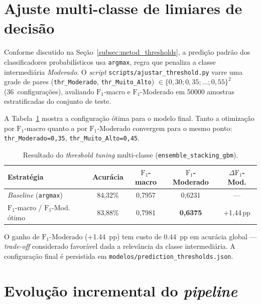 \section{Ajuste multi-classe de limiares de decisão}
\label{sec:res_threshold}

Conforme discutido na Seção~\ref{subsec:metod_thresholds}, a predição padrão dos classificadores probabilísticos usa \texttt{argmax}, regra que penaliza a classe intermediária \emph{Moderado}. O \emph{script} \texttt{scripts/ajustar\_threshold.py} varre uma grade de pares (\texttt{thr\_Moderado}, \texttt{thr\_Muito\_Alto}) \(\in \{0{,}30; 0{,}35; \ldots; 0{,}55\}^2\) (36~configurações), avaliando \(\text{F}_1\)-macro e \(\text{F}_1\)-Moderado em \num{50000} amostras estratificadas do conjunto de teste.

A Tabela~\ref{tab:res_threshold} mostra a configuração ótima para o modelo final. Tanto a otimização por \(\text{F}_1\)-macro quanto a por \(\text{F}_1\)-Moderado convergem para o mesmo ponto: \texttt{thr\_Moderado=0,35}, \texttt{thr\_Muito\_Alto=0,45}.

\begin{table}[h]
\centering
\caption{Resultado do \emph{threshold tuning} multi-classe (\texttt{ensemble\_stacking\_gbm}).}
\label{tab:res_threshold}
\begin{tabular}{lcccc}
\toprule
\textbf{Estratégia} & \textbf{Acurácia} & \textbf{$\text{F}_1$-macro} & \textbf{$\text{F}_1$-Moderado} & \textbf{$\Delta \text{F}_1$-Mod.} \\
\midrule
\emph{Baseline} (\texttt{argmax})    & 84,32\% & 0,7957 & 0,6231 & --- \\
$\text{F}_1$-macro / $\text{F}_1$-Mod. ótimo & 83,88\% & 0,7981 & \textbf{0,6375} & +1,44\,pp \\
\bottomrule
\end{tabular}
\end{table}

O ganho de \(\text{F}_1\)-Moderado (+\SI{1,44}{pp}) tem custo de \SI{0,44}{pp} em acurácia global --- \emph{trade-off} considerado favorável dada a relevância da classe intermediária. A configuração final é persistida em \texttt{modelos/prediction\_thresholds.json}.

\section{Evolução incremental do \emph{pipeline}}
\label{sec:res_evolucao}

